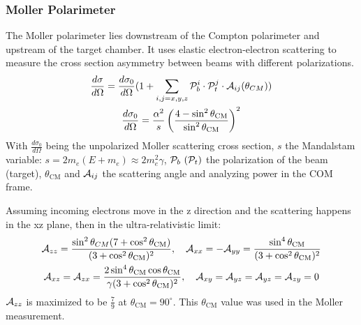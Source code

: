 \subsubsection{Moller Polarimeter}
The Moller polarimeter lies downstream of the Compton polarimeter and upstream 
of the target chamber. It uses elastic electron-electron scattering to measure the
cross section asymmetry between beams with different polarizations. 
\begin{equation}
    \begin{gathered}
	\frac{d\sigma}{d\Omega} = \frac{d\sigma_0}{d\Omega} (1 + \sum_{i,j=x,y,z} \mathcal{P}_b^i \cdot \mathcal{P}_t^j \cdot \mathcal{A}_{ij}(\theta_{CM})) \\
	\frac{d\sigma_0}{d\Omega} = \frac{\alpha^2}{s} \left( \frac{4 - \sin^2\theta_{\mathrm{CM}}}{\sin^2\theta_{\mathrm{CM}}}\right)^2 
    \end{gathered}
    \label{eq:moller_xsection}
\end{equation}
With $\frac{d\sigma_0}{d\Omega}$ being the unpolarized Moller scattering cross section,
$s$ the Mandalstam variable: $s = 2m_e(E+m_e) \approx 2m_e^2\gamma$,
$\mathcal{P}_b \ (\mathcal{P}_t)$ the polarization of the beam (target),
$\theta_{\mathrm{CM}}$ and $\mathcal{A}_{ij}$ the scattering angle and analyzing power in the COM frame. 

Assuming incoming electrons move in the z direction and the scattering happens
in the xz plane, then in the ultra-relativistic limit:
\begin{equation}
    \begin{gathered}
	\mathcal{A}_{zz} = \frac{\sin^2\theta_{CM} (7 + \cos^2\theta_{\mathrm{CM}})}{(3+\cos^2\theta_{\mathrm{CM}})^2},
	\quad
	\mathcal{A}_{xx} = -\mathcal{A}_{yy} = \frac{\sin^4\theta_{\mathrm{CM}}}{(3+\cos^2\theta_{\mathrm{CM}})^2}	\\
	\mathcal{A}_{xz} = \mathcal{A}_{zx} = \frac{2\sin^4\theta_{\mathrm{CM}}\cos\theta_{\mathrm{CM}}}{\gamma(3+\cos^2\theta_{\mathrm{CM}})^2},
	\quad
	\mathcal{A}_{xy} = \mathcal{A}_{yz} = \mathcal{A}_{yz} = \mathcal{A}_{zy} = 0
    \end{gathered}
\end{equation}
$\mathcal{A}_{zz}$ is maximized to be $\frac{7}{9}$ at $\theta_{\mathrm{CM}} = 90^\circ$.
This $\theta_{\text{CM}}$ value was used in the Moller measurement.

